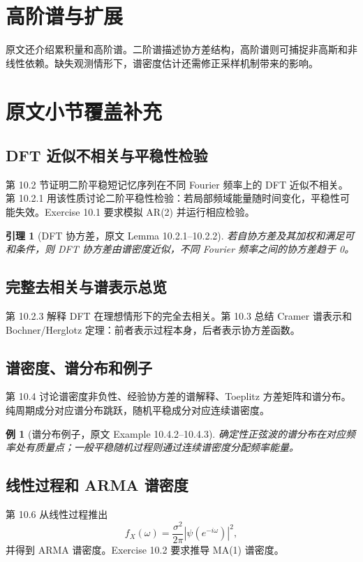 \documentclass[11pt,a4paper]{ctexart}
\newtheorem{lemma}{引理}[section]
\newtheorem{example}{例}[section]
\begin{document}
\section{高阶谱与扩展}

原文还介绍累积量和高阶谱。二阶谱描述协方差结构，高阶谱则可捕捉非高斯和非线性依赖。缺失观测情形下，谱密度估计还需修正采样机制带来的影响。

\section{原文小节覆盖补充}

\subsection{DFT 近似不相关与平稳性检验}
第 10.2 节证明二阶平稳短记忆序列在不同 Fourier 频率上的 DFT 近似不相关。第 10.2.1 用该性质讨论二阶平稳性检验：若局部频域能量随时间变化，平稳性可能失效。Exercise 10.1 要求模拟 AR(2) 并运行相应检验。

\begin{lemma}[DFT 协方差，原文 Lemma 10.2.1--10.2.2]
若自协方差及其加权和满足可和条件，则 DFT 协方差由谱密度近似，不同 Fourier 频率之间的协方差趋于 0。
\end{lemma}

\subsection{完整去相关与谱表示总览}
第 10.2.3 解释 DFT 在理想情形下的完全去相关。第 10.3 总结 Cramer 谱表示和 Bochner/Herglotz 定理：前者表示过程本身，后者表示协方差函数。

\subsection{谱密度、谱分布和例子}
第 10.4 讨论谱密度非负性、经验协方差的谱解释、Toeplitz 方差矩阵和谱分布。纯周期成分对应谱分布跳跃，随机平稳成分对应连续谱密度。

\begin{example}[谱分布例子，原文 Example 10.4.2--10.4.3]
确定性正弦波的谱分布在对应频率处有质量点；一般平稳随机过程则通过连续谱密度分配频率能量。
\end{example}

\subsection{线性过程和 ARMA 谱密度}
第 10.6 从线性过程推出
\[
  f_X(\omega)=\frac{\sigma^2}{2\pi}|\psi(e^{-i\omega})|^2,
\]
并得到 ARMA 谱密度。Exercise 10.2 要求推导 MA(1) 谱密度。
\end{document}
